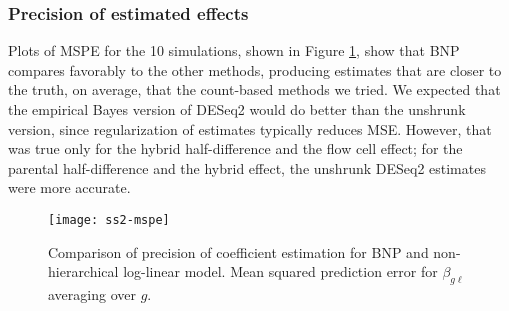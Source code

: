 \subsubsection{Precision of estimated effects}
Plots of MSPE for the 10 simulations, shown in Figure \ref{ss2-mspe}, show that BNP compares favorably to the other methods, producing estimates that are closer to the truth, on average, that the count-based methods we tried. We expected that the empirical Bayes version of DESeq2 would do better than the unshrunk version, since regularization of estimates typically reduces MSE. However, that was true only for the hybrid half-difference and the flow cell effect; for the parental half-difference and the hybrid effect, the unshrunk DESeq2 estimates were more accurate.

\begin{figure}[ht!]
\centering
\texttt{[image: ss2-mspe]}
\begin{minipage}{.8\textwidth}
\caption{\small Comparison of precision of coefficient estimation for BNP and non-hierarchical log-linear model. Mean squared prediction error for $\beta_{g\ell}$ averaging over $g$.}
\label{ss2-mspe}
\end{minipage}
\end{figure}

